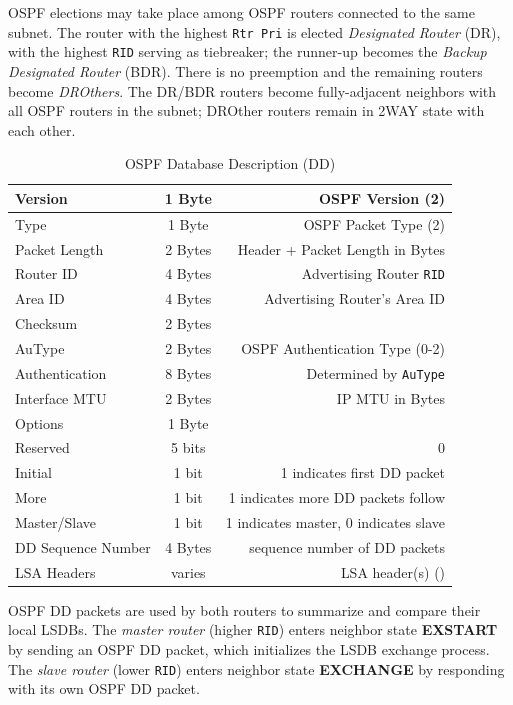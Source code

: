 \documentclass[12pt]{article}
\begin{document}
	OSPF elections may take place among OSPF routers connected to the same subnet. The router with the highest \texttt{Rtr Pri} is elected \textit{Designated Router} (DR), with the highest \texttt{RID} serving as tiebreaker; the runner-up becomes the \textit{Backup Designated Router} (BDR). There is no preemption and the remaining routers become \textit{DROthers}. The DR/BDR routers become fully-adjacent neighbors with all OSPF routers in the subnet; DROther routers remain in 2WAY state with each other.

	\begin{table}[H]
	\centering
	\caption{OSPF Database Description (DD) \label{tab:OSPF DD}}
	\begin{tabular}{| l | c | r |}\hline
	Version			& 1 Byte	& OSPF Version (2)\\\hline
	Type				& 1 Byte	& OSPF Packet Type (2)\\\hline
	Packet Length		& 2 Bytes	& Header + Packet Length in Bytes\\\hline
	Router ID			& 4 Bytes	& Advertising Router \texttt{RID}\\\hline
	Area ID			& 4 Bytes	& Advertising Router's Area ID\\\hline
	Checksum			& 2 Bytes	&\\\hline
	AuType			& 2 Bytes	& OSPF Authentication Type (0-2)\\\hline
	Authentication		& 8 Bytes	& Determined by \texttt{AuType}\\\hline
	Interface MTU		& 2 Bytes	& IP MTU in Bytes\\\hline
	Options			& 1 Byte	&\\\hline
	Reserved			& 5 bits	& 0\\\hline
	Initial				& 1 bit 	& 1 indicates first DD packet\\\hline 
	More				& 1 bit 	& 1 indicates more DD packets follow\\\hline
	Master/Slave		& 1 bit 	& 1 indicates master, 0 indicates slave\\\hline
	DD Sequence Number	& 4 Bytes	& sequence number of DD packets\\\hline
	LSA Headers		& varies	& LSA header(s) (\Cref{tab:OSPF LSA})\\\hline
	\end{tabular}\end{table}
	OSPF DD packets are used by both routers to summarize and compare their local LSDBs. The \textit{master router} (higher \texttt{RID}) enters neighbor state \textbf{EXSTART} by sending an OSPF DD packet, which initializes the LSDB exchange process. The \textit{slave router} (lower \texttt{RID}) enters neighbor state \textbf{EXCHANGE} by responding with its own OSPF DD packet.
\end{document}
